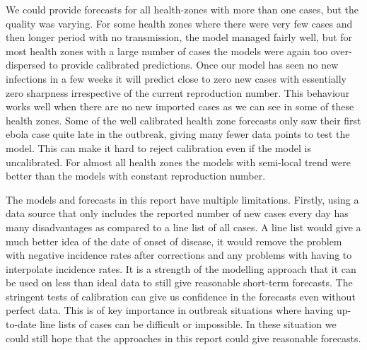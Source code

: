 \documentclass[12pt]{article}
\begin{document}
We could provide forecasts for all health-zones with more than one cases, but the quality was varying. For some health zones where there were very few cases and then longer period with no transmission, the model managed fairly well, but for most health zones with a large number of cases the models were again too over-dispersed to provide calibrated predictions. Once our model has seen no new infections in a few weeks it will predict close to zero new cases with essentially zero sharpness irrespective of the current reproduction number. This behaviour works well when there are no new imported cases as we can see in some of these health zones. Some of the well calibrated health zone forecasts only saw their first ebola case quite late in the outbreak, giving many fewer data points to test the model. This can make it hard to reject calibration even if the model is uncalibrated. For almost all health zones the models with semi-local trend were better than the models with constant reproduction number. 



The models and forecasts in this report have multiple limitations. Firstly, using a data source that only includes the reported number of new cases every day has many disadvantages as compared to a line list of all cases. A line list would give a much better idea of the date of onset of disease, it would remove the problem with negative incidence rates after corrections and any problems with having to interpolate incidence rates. It is a strength of the modelling approach that it can be used on less than ideal data to still give reasonable short-term forecasts. The stringent tests of calibration can give us confidence in the forecasts even without perfect data. This is of key importance in outbreak situations where having up-to-date line lists of cases can be difficult or impossible. In these situation we could still hope that the approaches in this report could give reasonable forecasts. 
\end{document}
